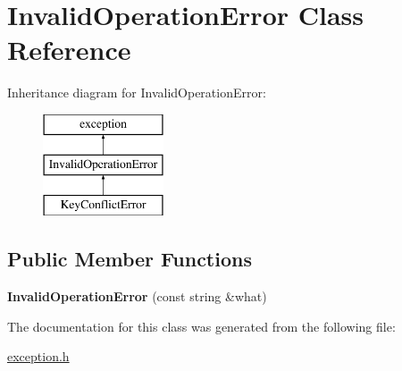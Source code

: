 \hypertarget{class_invalid_operation_error}{\section{Invalid\-Operation\-Error Class Reference}
\label{class_invalid_operation_error}
}
Inheritance diagram for Invalid\-Operation\-Error\-:\begin{figure}[H]
\begin{center}
\leavevmode
\includegraphics[height=3.000000cm]{class_invalid_operation_error}
\end{center}
\end{figure}
\subsection*{Public Member Functions}
\begin{DoxyCompactItemize}
\item 
\hypertarget{class_invalid_operation_error_a175538ef340664cf364e0310c3c7221d}{{\bfseries Invalid\-Operation\-Error} (const string \&what)}\label{class_invalid_operation_error_a175538ef340664cf364e0310c3c7221d}

\end{DoxyCompactItemize}


The documentation for this class was generated from the following file\-:\begin{DoxyCompactItemize}
\item 
\hyperlink{exception_8h}{exception.\-h}\end{DoxyCompactItemize}
